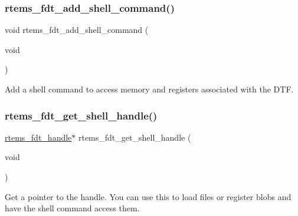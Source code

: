 \subsubsection{\texorpdfstring{rtems\_fdt\_add\_shell\_command()}{rtems\_fdt\_add\_shell\_command()}}
{\footnotesize\ttfamily void rtems\+\_\+fdt\+\_\+add\+\_\+shell\+\_\+command (\begin{DoxyParamCaption}\item[{void}]{ }\end{DoxyParamCaption})}

Add a shell command to access memory and registers associated with the D\+TF. \mbox{\label{rtems-fdt-shell_8c_a60aacc9efa15224a053dc5c51f1cbd4b}} 
\subsubsection{\texorpdfstring{rtems\_fdt\_get\_shell\_handle()}{rtems\_fdt\_get\_shell\_handle()}}
{\footnotesize\ttfamily \mbox{\hyperlink{structrtems__fdt__handle}{rtems\+\_\+fdt\+\_\+handle}}$\ast$ rtems\+\_\+fdt\+\_\+get\+\_\+shell\+\_\+handle (\begin{DoxyParamCaption}\item[{void}]{ }\end{DoxyParamCaption})}

Get a pointer to the handle. You can use this to load files or register blobs and have the shell command access them. 